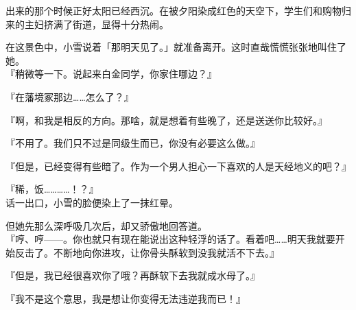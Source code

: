 出来的那个时候正好太阳已经西沉。在被夕阳染成红色的天空下，学生们和购物归来的主妇挤满了街道，显得十分热闹。

在这景色中，小雪说着「那明天见了。」就准备离开。这时直哉慌慌张张地叫住了她。\\

『稍微等一下。说起来白金同学，你家住哪边？』

『在藩境冢那边……怎么了？』

『啊，和我是相反的方向。那啥，就是想着有些晚了，还是送送你比较好。』

『不用了。我们只不过是同级生而已，你没有必要这么做。』

『但是，已经变得有些暗了。作为一个男人担心一下喜欢的人是天经地义的吧？』

『稀，饭…………！？』\\

话一出口，小雪的脸便染上了一抹红晕。

但她先那么深呼吸几次后，却又骄傲地回答道。\\

『哼、哼——。你也就只有现在能说出这种轻浮的话了。看着吧……明天我就要开始反击了。不断地向你进攻，让你骨头酥软到没我就活不下去。』

『但是，我已经很喜欢你了哦？再酥软下去我就成水母了。』

『我不是这个意思，我是想让你变得无法违逆我而已！』\\

